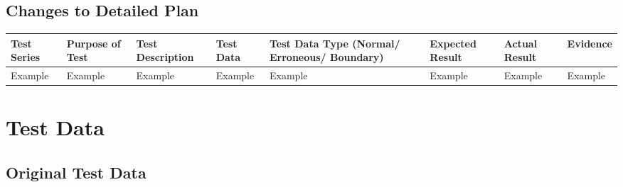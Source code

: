 \begin{landscape}
\subsection{Changes to Detailed Plan}

\begin{center}
    \begin{longtable}{|p{1.5cm}|p{2.5cm}|p{2.5cm}|p{2cm}|p{2cm}|p{2cm}|p{2cm}|p{2cm}|}
        \hline
        \textbf{Test Series} & \textbf{Purpose of Test} & \textbf{Test Description} & \textbf{Test Data} & \textbf{Test Data Type (Normal/ Erroneous/ Boundary)} & \textbf{Expected Result} & \textbf{Actual Result} & \textbf{Evidence}\\ \hline
        Example & Example & Example & Example & Example & Example & Example & Example \\ \hline
    \end{longtable}
\end{center}
\end{landscape}
\section{Test Data}

\subsection{Original Test Data}

